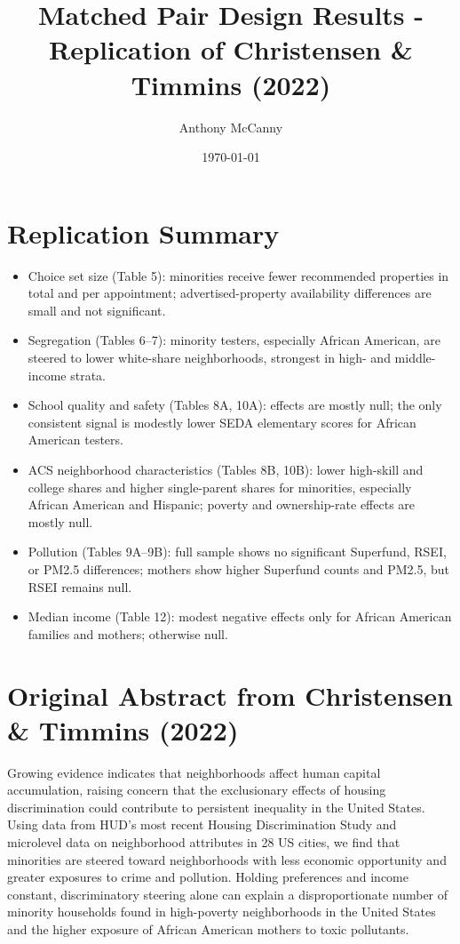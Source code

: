 \documentclass[11pt]{article}
\title{Matched Pair Design Results - Replication of Christensen \& Timmins (2022)}
\author{Anthony McCanny}
\date{\today}
\begin{document}
\maketitle


\section*{Replication Summary}
\begin{itemize}
  \item Choice set size (Table 5): minorities receive fewer recommended properties in total and per appointment; advertised-property availability differences are small and not significant.
  \item Segregation (Tables 6--7): minority testers, especially African American, are steered to lower white-share neighborhoods, strongest in high- and middle-income strata.
  \item School quality and safety (Tables 8A, 10A): effects are mostly null; the only consistent signal is modestly lower SEDA elementary scores for African American testers.
  \item ACS neighborhood characteristics (Tables 8B, 10B): lower high-skill and college shares and higher single-parent shares for minorities, especially African American and Hispanic; poverty and ownership-rate effects are mostly null.
  \item Pollution (Tables 9A--9B): full sample shows no significant Superfund, RSEI, or PM2.5 differences; mothers show higher Superfund counts and PM2.5, but RSEI remains null.
  \item Median income (Table 12): modest negative effects only for African American families and mothers; otherwise null.
\end{itemize}

\section*{Original Abstract from Christensen \& Timmins (2022)}
Growing evidence indicates that neighborhoods affect human capital accumulation, raising concern that the exclusionary effects of housing discrimination could contribute to persistent inequality in the United States. Using data from HUD's most recent Housing Discrimination Study and microlevel data on neighborhood attributes in 28 US cities, we find that minorities are steered toward neighborhoods with less economic opportunity and greater exposures to crime and pollution. Holding preferences and income constant, discriminatory steering alone can explain a disproportionate number of minority households found in high-poverty neighborhoods in the United States and the higher exposure of African American mothers to toxic pollutants.
\end{document}
